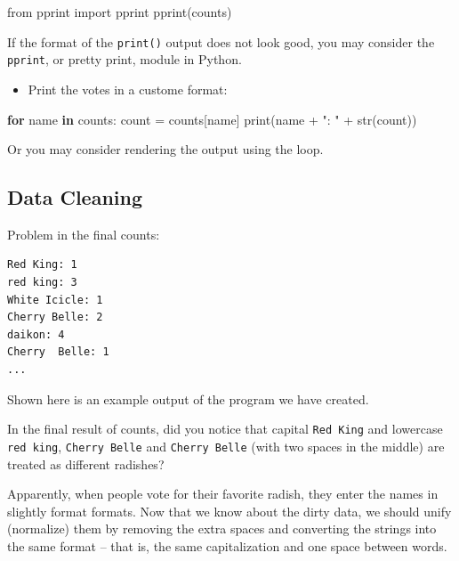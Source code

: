 \documentclass[
  letterpaper,
]{scrbook}
\newenvironment{Shaded}{\begin{snugshade}}{\end{snugshade}}
\newcommand{\BuiltInTok}[1]{\textcolor[rgb]{0.00,0.23,0.31}{#1}}
\newcommand{\ControlFlowTok}[1]{\textcolor[rgb]{0.00,0.23,0.31}{\textbf{#1}}}
\newcommand{\ImportTok}[1]{\textcolor[rgb]{0.00,0.46,0.62}{#1}}
\newcommand{\KeywordTok}[1]{\textcolor[rgb]{0.00,0.23,0.31}{\textbf{#1}}}
\newcommand{\NormalTok}[1]{\textcolor[rgb]{0.00,0.23,0.31}{#1}}
\newcommand{\OperatorTok}[1]{\textcolor[rgb]{0.37,0.37,0.37}{#1}}
\newcommand{\StringTok}[1]{\textcolor[rgb]{0.13,0.47,0.30}{#1}}
\providecommand{\tightlist}{%
  \setlength{\itemsep}{0pt}\setlength{\parskip}{0pt}}
\begin{document}
\begin{Shaded}
\begin{Highlighting}[]
\ImportTok{from}\NormalTok{ pprint }\ImportTok{import}\NormalTok{ pprint}
\NormalTok{pprint(counts)}
\end{Highlighting}
\end{Shaded}

If the format of the \texttt{print()} output does not look good, you may
consider the \texttt{pprint}, or pretty print, module in Python.

\begin{itemize}
\tightlist
\item
  Print the votes in a custome format:
\end{itemize}

\begin{Shaded}
\begin{Highlighting}[]
\ControlFlowTok{for}\NormalTok{ name }\KeywordTok{in}\NormalTok{ counts:}
\NormalTok{    count }\OperatorTok{=}\NormalTok{ counts[name]}
    \BuiltInTok{print}\NormalTok{(name }\OperatorTok{+} \StringTok{": "} \OperatorTok{+} \BuiltInTok{str}\NormalTok{(count))}
\end{Highlighting}
\end{Shaded}

Or you may consider rendering the output using the loop.

\subsection*{Data Cleaning}\label{data-cleaning}

Problem in the final counts:

\begin{verbatim}
Red King: 1
red king: 3
White Icicle: 1
Cherry Belle: 2
daikon: 4
Cherry  Belle: 1
...
\end{verbatim}

Shown here is an example output of the program we have created.

In the final result of counts, did you notice that capital
\texttt{Red\ King} and lowercase \texttt{red\ king},
\texttt{Cherry\ Belle} and \texttt{Cherry\ Belle} (with two spaces in
the middle) are treated as different radishes?

Apparently, when people vote for their favorite radish, they enter the
names in slightly format formats. Now that we know about the dirty data,
we should unify (normalize) them by removing the extra spaces and
converting the strings into the same format -- that is, the same
capitalization and one space between words.
\end{document}
